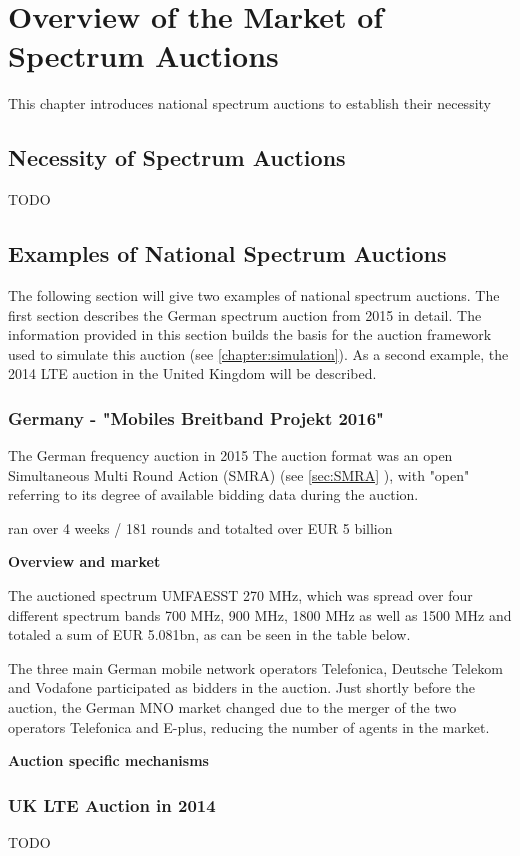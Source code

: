 
\chapter{Overview of the Market of Spectrum Auctions}\label{chapter:overview}
This chapter introduces national spectrum auctions to establish their necessity 

\section{Necessity of Spectrum Auctions}
TODO

\section{Examples of National Spectrum Auctions}
The following section will give two examples of national spectrum auctions. The first section describes the German spectrum auction from 2015 in detail. The information provided in this section builds the basis for the auction framework used to simulate this auction (see \autoref{chapter:simulation}). As a second example, the 2014 LTE auction in the United Kingdom will be described.

\subsection{Germany - "Mobiles Breitband Projekt 2016"} \label{sec:MBP16}
The German frequency auction in 2015 
The auction format was an open Simultaneous Multi Round Action (SMRA) %
(see \autoref{sec:SMRA} %
), with "open" referring to its degree of available bidding data during the auction.

ran over 4 weeks / 181 rounds and totalted over EUR 5 billion

\textbf{Overview and market} 

The auctioned spectrum UMFAESST 270 MHz, which was spread over four different spectrum bands 700 MHz, 900 MHz, 1800 MHz as well as 1500 MHz and totaled a sum of EUR 5.081bn, as can be seen in the table below. %


The three main German mobile network operators %
Telefonica, Deutsche Telekom and Vodafone participated as bidders in the auction.
Just shortly before the auction, the German MNO market changed due to the merger of the two operators Telefonica and E-plus, reducing the number of agents in the market.


\textbf{Auction specific mechanisms}






\subsection{UK LTE Auction in 2014}
TODO